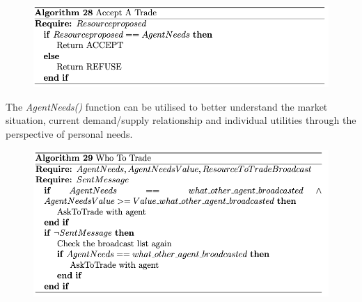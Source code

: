 
\begin{figure}[htb]
    \centering
    \includegraphics[scale=0.7]{006_team_3_agent_design/FIGS/Algo28.png}
    \label{fig:algo28}
\end{figure}


The \textit{AgentNeeds()} function can be utilised to better understand the market situation, current demand/supply relationship and individual utilities through the perspective of personal needs.


\begin{figure}[htb]
    \centering
    \includegraphics[scale=0.7]{006_team_3_agent_design/FIGS/Algo29.png}
    \label{fig:algo29}
\end{figure}

